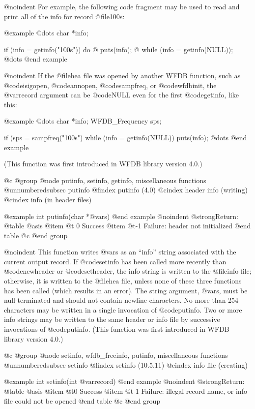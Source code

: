 {{{{{{{{{@noindent
For example, the following code fragment may be used to read and print all of
the info for record @file{100s}:

@example
@dots{}
char *info;

if (info = getinfo("100s"))
    do @{
        puts(info);
    @} while (info = getinfo(NULL));
@dots{}
@end example

@noindent
If the @file{hea} file was opened by another WFDB function, such as
@code{isigopen}, @code{annopen}, @code{sampfreq}, or @code{wfdbinit},
the @var{record} argument can be @code{NULL} even for the first @code{getinfo},
like this:

@example
@dots{}
char *info;
WFDB_Frequency sps;

if (sps = sampfreq("100s")
    while (info = getinfo(NULL))
        puts(info);
@dots{}
@end example

(This function was first introduced in WFDB library version 4.0.)

@c @group
@node     putinfo, setinfo, getinfo, miscellaneous functions
@unnumberedsubsec putinfo
@findex putinfo (4.0)
@cindex header info (writing)
@cindex info (in header files)

@example
int putinfo(char *@var{s})
@end example
@noindent
@strong{Return:}
@table @asis
@item @t{ 0}
Success
@item @t{-1}
Failure: header not initialized
@end table
@c @end group

@noindent
This function writes @var{s} as an ``info'' string associated with the current
output record.  If @code{setinfo} has been called more recently than
@code{newheader} or @code{setheader}, the info string is written to the
@file{info} file; otherwise, it is written to the @file{hea} file, unless none
of these three functions has been called (which results in an error).  The
string argument, @var{s}, must be null-terminated and should not contain
newline characters.  No more than 254 characters may be written in a single
invocation of @code{putinfo}.  Two or more info strings may be written to the
same header or info file by successive invocations of @code{putinfo}.
(This function was first introduced in WFDB library version 4.0.)

@c @group
@node     setinfo, wfdb_freeinfo, putinfo, miscellaneous functions
@unnumberedsubsec setinfo
@findex setinfo (10.5.11)
@cindex info file (creating)

@example
int setinfo(int @var{record})
@end example
@noindent
@strong{Return:}
@table @asis
@item @t{0}
Success
@item @t{-1}
Failure: illegal record name, or info file could not be opened
@end table
@c @end group

}}}}}}}}}
